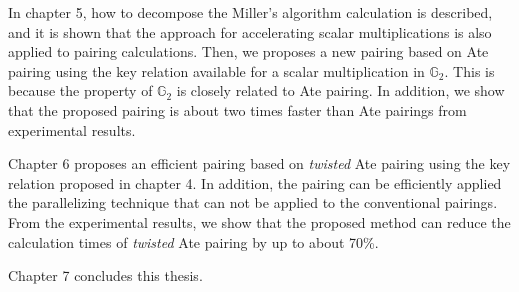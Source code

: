 In chapter 5, how to decompose the Miller's algorithm calculation is described, and it is shown that the approach for accelerating scalar multiplications is also applied to pairing calculations.
Then, we proposes a new pairing based on Ate pairing using the key relation available for a scalar multiplication in $\mathbb{G}_2$.
This is because the property of $\mathbb{G}_2$ is closely related to Ate pairing.
In addition, we show that the proposed pairing is about two times faster than Ate pairings from experimental results.   

Chapter 6 proposes an efficient pairing based on {\it twisted} Ate pairing using the key relation proposed in chapter 4.
In addition, the pairing can be efficiently applied the parallelizing technique that can not be applied to the conventional pairings.
From the experimental results, we show that the proposed method can reduce the calculation times of {\it twisted} Ate pairing by up to about 70\%. 

Chapter 7 concludes this thesis.
